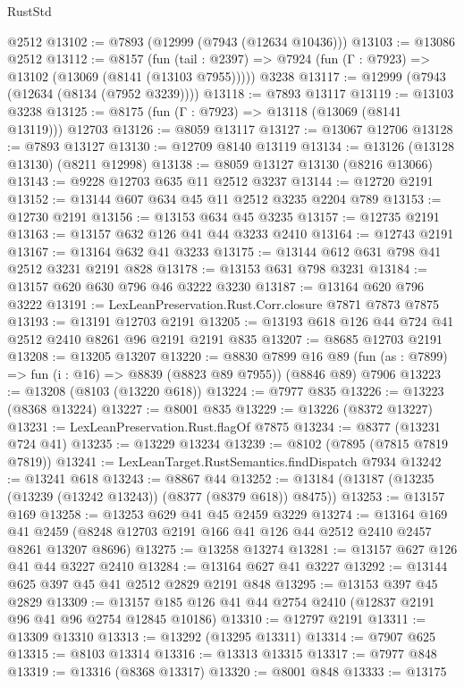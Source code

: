 \begin{lexlean}{RustStd}
\begin{coremodule}
{\begin{coremodule}
{{{{{{{{{{{{{{{{{{{{{{{{{{{{{{{{{{{{{{{{{{{{{{{{{{    @2512
@13102 := @7893 (@12999 (@7943 (@12634 @10436)))
@13103 := @13086 @2512
@13112 := @8157
    (fun (tail : @2397) => @7924 (fun (Γ : @7923) => @13102 (@13069 (@8141 (@13103 @7955)))))
    @3238
@13117 := @12999 (@7943 (@12634 (@8134 (@7952 @3239))))
@13118 := @7893 @13117
@13119 := @13103 @3238
@13125 := @8175 (fun (Γ : @7923) => @13118 (@13069 (@8141 @13119))) @12703
@13126 := @8059 @13117
@13127 := @13067 @12706
@13128 := @7893 @13127
@13130 := @12709 @8140 @13119
@13134 := @13126 (@13128 @13130) (@8211 @12998)
@13138 := @8059 @13127 @13130 (@8216 @13066)
@13143 := @9228 @12703 @635 @11 @2512 @3237
@13144 := @12720 @2191
@13152 := @13144 @607 @634 @45 @11 @2512 @3235 @2204 @789
@13153 := @12730 @2191
@13156 := @13153 @634 @45 @3235
@13157 := @12735 @2191
@13163 := @13157 @632 @126 @41 @44 @3233 @2410
@13164 := @12743 @2191
@13167 := @13164 @632 @41 @3233
@13175 := @13144 @612 @631 @798 @41 @2512 @3231 @2191 @828
@13178 := @13153 @631 @798 @3231
@13184 := @13157 @620 @630 @796 @46 @3222 @3230
@13187 := @13164 @620 @796 @3222
@13191 := LexLeanPreservation.Rust.Corr.closure @7871 @7873 @7875
@13193 := @13191 @12703 @2191
@13205 := @13193 @618 @126 @44 @724 @41 @2512 @2410 @8261 @96 @2191 @2191 @835
@13207 := @8685 @12703 @2191
@13208 := @13205 @13207
@13220 := @8830
    @7899
    @16
    @89
    (fun (as : @7899) => fun (i : @16) => @8839 (@8823 @89 @7955))
    (@8846 @89)
    @7906
@13223 := @13208 (@8103 (@13220 @618))
@13224 := @7977 @835
@13226 := @13223 (@8368 @13224)
@13227 := @8001 @835
@13229 := @13226 (@8372 @13227)
@13231 := LexLeanPreservation.Rust.flagOf @7875
@13234 := @8377 (@13231 @724 @41)
@13235 := @13229 @13234
@13239 := @8102 (@7895 (@7815 @7819 @7819))
@13241 := LexLeanTarget.RustSemantics.findDispatch @7934
@13242 := @13241 @618
@13243 := @8867 @44
@13252 := @13184 (@13187 (@13235 (@13239 (@13242 @13243)) (@8377 (@8379 @618)) @8475))
@13253 := @13157 @169
@13258 := @13253 @629 @41 @45 @2459 @3229
@13274 := @13164
    @169
    @41
    @2459
    (@8248 @12703 @2191 @166 @41 @126 @44 @2512 @2410 @2457 @8261 @13207 @8696)
@13275 := @13258 @13274
@13281 := @13157 @627 @126 @41 @44 @3227 @2410
@13284 := @13164 @627 @41 @3227
@13292 := @13144 @625 @397 @45 @41 @2512 @2829 @2191 @848
@13295 := @13153 @397 @45 @2829
@13309 := @13157 @185 @126 @41 @44 @2754 @2410 (@12837 @2191 @96 @41 @96 @2754 @12845 @10186)
@13310 := @12797 @2191
@13311 := @13309 @13310
@13313 := @13292 (@13295 @13311)
@13314 := @7907 @625
@13315 := @8103 @13314
@13316 := @13313 @13315
@13317 := @7977 @848
@13319 := @13316 (@8368 @13317)
@13320 := @8001 @848
@13333 := @13175
}}}}}}}}}}}}}}}}}}}}}}}}}}}}}}}}}}}}}}}}}}}}}}}}}}
\end{coremodule}}
\end{coremodule}
\end{lexlean}

